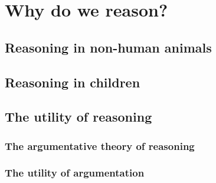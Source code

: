 \chapter{Why do we reason?}
\label{ch:reasoning}


\section{Reasoning in non-human animals}

\section{Reasoning in children}

\section{The utility of reasoning}



\subsection{The argumentative theory of reasoning}

\subsection{The utility of argumentation}
